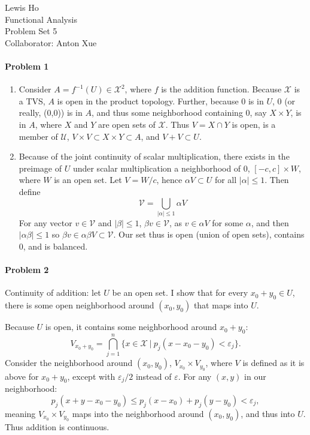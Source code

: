 \documentclass[12pt]{article}
\newcommand{\X}{\mathcal{X}}
\begin{document}
\begin{center}
  Lewis Ho\\
  Functional Analysis\\
  Problem Set 5\\
  Collaborator: Anton Xue
\end{center}

\paragraph{Problem 1}

\begin{enumerate}[label=\alph*)]
\item Consider $A = f^{-1}(U) \in \X^2$, where $f$ is the addition function.
  Because $\X$ is a TVS, $A$ is open in the product topology. Further, because
  0 is in $U$, 0 (or really, (0,0)) is in $A$, and thus some neighborhood
  containing 0, say $X\times Y$, is in $A$, where $X$ and $Y$ are open sets
  of $\X$. Thus $V = X\cap Y$ is open, is a member of $\mathcal{U}$,
  $V\times V \subset X\times Y \subset A$, and $V+V \subset U$.
\item Because of the joint continuity of scalar multiplication, there exists
  in the preimage of $U$ under scalar multiplication a neighborhood of 0,
  $[-c, c]\times W$, where $W$ is an open set. Let $V = W/c$, hence $\alpha V
  \subset U$ for all $|\alpha| \leq 1$. Then define
  \begin{displaymath}
    \mathcal{V} = \bigcup_{|\alpha| \leq 1}\alpha V
  \end{displaymath}
  For any vector $v \in \mathcal{V}$ and $|\beta| \leq 1$, $\beta v \in
  \mathcal{V}$, as $v \in \alpha V$ for some $\alpha$, and then $|\alpha\beta|
  \leq 1$ so $\beta v \in \alpha\beta V \subset \mathcal{V}$. Our set
  thus is open (union of open sets), contains 0, and is balanced.
\end{enumerate}

\paragraph{Problem 2}

Continuity of addition: let $U$ be an open set. I show that for every $x_0 +
y_0 \in U$, there is some open neighborhood around $(x_0,y_0)$ that maps into
$U$.

Because $U$ is open, it contains some neighborhood around $x_0+y_0$:
\begin{displaymath}
  V_{x_0+y_0} = \bigcap_{j=1}^n\{x\in \X\ |\ p_j(x-x_0-y_0) < \varepsilon_j\}.
\end{displaymath}
Consider the neighborhood around $(x_0,y_0)$, $V_{x_0}\times V_{y_0}$,
where $V$ is defined as it is above for ${x_0+y_0}$, except with $\varepsilon_j
/2$ instead of $\varepsilon$. For any $(x,y)$ in our neighborhood:
\begin{displaymath}
  p_j(x+y-x_0-y_0) \leq p_j(x-x_0)+p_j(y-y_0) < \varepsilon_j,
\end{displaymath}
meaning $V_{x_0}\times V_{y_0}$ maps into the neighborhood around $(x_0,y_0)$,
and thus into $U$. Thus addition is continuous.
\end{document}
